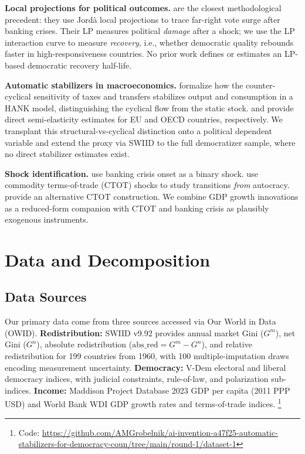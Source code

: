 \documentclass[11pt,letterpaper]{article}
\begin{document}
\textbf{Local projections for political outcomes.} \citet{Funke2016} are the closest methodological precedent: they use Jord\`a local projections to trace far-right vote surge after banking crises. Their LP measures political \emph{damage} after a shock; we use the LP interaction curve to measure \emph{recovery}, i.e., whether democratic quality rebounds faster in high-responsiveness countries. No prior work defines or estimates an LP-based democratic recovery half-life.

\textbf{Automatic stabilizers in macroeconomics.} \citet{McKay2016} formalize how the counter-cyclical sensitivity of taxes and transfers stabilizes output and consumption in a HANK model, distinguishing the cyclical flow from the static stock. \citet{Mourre2019} and \citet{Maravalle2020} provide direct semi-elasticity estimates for EU and OECD countries, respectively. We transplant this structural-vs-cyclical distinction onto a political dependent variable and extend the proxy via SWIID to the full democratizer sample, where no direct stabilizer estimates exist.

\textbf{Shock identification.} \citet{Funke2016} use \citet{Laeven2020} banking crisis onset as a binary shock. \citet{Janus2022} use \citet{Gruss2019} commodity terms-of-trade (CTOT) shocks to study transitions \emph{from} autocracy. \citet{Bazzi2014} provide an alternative CTOT construction. We combine GDP growth innovations as a reduced-form companion with CTOT and banking crisis as plausibly exogenous instruments.

\section{Data and Decomposition}
\label{sec:data}

\subsection{Data Sources}

Our primary data come from three sources accessed via Our World in Data (OWID). \textbf{Redistribution:} SWIID v9.92 \citep{Solt2020} provides annual market Gini ($G^m$), net Gini ($G^n$), absolute redistribution ($\text{abs\_red} = G^m - G^n$), and relative redistribution for 199 countries from 1960, with 100 multiple-imputation draws encoding measurement uncertainty. \textbf{Democracy:} V-Dem electoral and liberal democracy indices, with judicial constraints, rule-of-law, and polarization sub-indices. \textbf{Income:} Maddison Project Database 2023 GDP per capita (2011 PPP USD) and World Bank WDI GDP growth rates and terms-of-trade indices. \footnote{Code: \url{https://github.com/AMGrobelnik/ai-invention-a47f25-automatic-stabilizers-for-democracy-coun/tree/main/round-1/dataset-1}}
\end{document}
